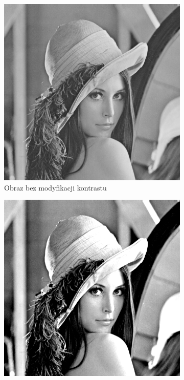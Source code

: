         \begin{figure}[H] 
            \centering
            \begin{subfigure}{0.49\textwidth}
                \centering
                \includegraphics[width = \textwidth]{img/2-theory/lenna10.png}
                \caption{Obraz bez modyfikacji kontrastu}
                \label{theory-contrast-lenna-a}
            \end{subfigure}
            \begin{subfigure}{0.49\textwidth}
                \centering
                \includegraphics[width = \textwidth]{img/2-theory/lenna20.png}

\end{subfigure}
\end{figure}
